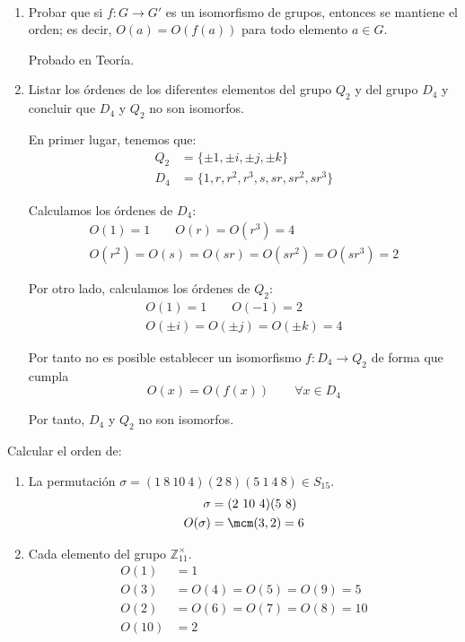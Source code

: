 \begin{ejercicio}\label{ej:2.30}~
    \begin{enumerate}
        \item Probar que si $f : G \to G'$ es un isomorfismo de grupos, entonces se mantiene el orden; es decir, $O(a) = O(f(a))$ para todo elemento $a \in G$.
        
        Probado en Teoría.
        \item Listar los órdenes de los diferentes elementos del grupo $Q_2$ y del grupo $D_4$ y concluir que $D_4$ y $Q_2$ no son isomorfos.
        
        En primer lugar, tenemos que:
        \begin{align*}
            Q_2 &= \{\pm 1, \pm i, \pm j, \pm k\}\\
            D_4 &= \{1, r, r^2, r^3, s, sr, sr^2, sr^3\}
        \end{align*}

        Calculamos los órdenes de $D_4$:
        \begin{gather*}
            O(1) =1\qquad O(r)=O(r^3)=4\\
            O(r^2)=O(s)=O(sr)=O(sr^2)=O(sr^3)=2
        \end{gather*}

        Por otro lado, calculamos los órdenes de $Q_2$:
        \begin{gather*}
            O(1)=1\qquad O(-1)=2\\
            O(\pm i)=O(\pm j)=O(\pm k)=4
        \end{gather*}

        Por tanto no es posible establecer un isomorfismo $f:D_4\to Q_2$ de forma que cumpla
        \begin{equation*}
            O(x)=O(f(x))\qquad \forall x\in D_4
        \end{equation*}

        Por tanto, $D_4$ y $Q_2$ no son isomorfos.
    \end{enumerate}
\end{ejercicio}

\begin{ejercicio}\label{ej:2.31}
    Calcular el orden de:
    \begin{enumerate}
        \item La permutación $\sigma = (1\ 8\ 10\ 4)(2\ 8)(5\ 1\ 4\ 8)\in S_{15}$.
        \begin{align*}
            \sigma &= (2\ 10\ 4)(5\ 8)\\
            O(\sigma) &= \mcm(3,2)=6
        \end{align*}
        \item Cada elemento del grupo $\mathbb{Z}^{\times}_{11}$.
        \begin{align*}
            O(1)&=1\\
            O(3)&=O(4)=O(5)=O(9)=5\\
            O(2)&=O(6)=O(7)=O(8)=10\\
            O(10)&=2
        \end{align*}
    \end{enumerate}
\end{ejercicio}

